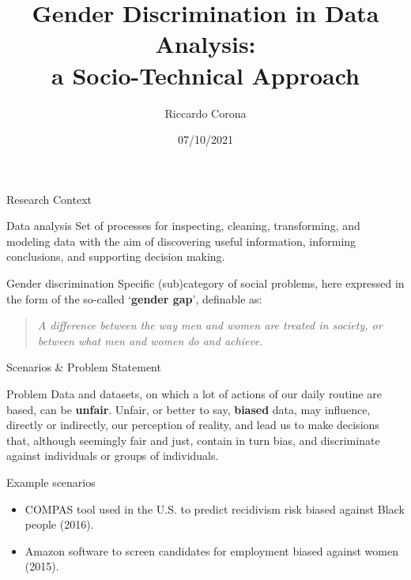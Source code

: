 \documentclass[usenames,dvipsnames]{beamer}
\title{Gender Discrimination in Data Analysis:\\a Socio-Technical Approach}
\author{Riccardo Corona}
\date{07/10/2021}
\begin{document}
    \begin{frame}
        \maketitle
    \end{frame}
    
    
    \begin{frame}{Research Context}
        \begin{block}{Data analysis}
            Set of processes for inspecting, cleaning, transforming, and modeling data with the aim of discovering useful information, informing conclusions, and supporting decision making.
        \end{block}
        \begin{block}{Gender discrimination}
            Specific (sub)category of social problems, here expressed in the form of the so-called `\textbf{gender gap}', definable as:
            \begin{quote}
            \emph{A difference between the way men and women are treated in society, or between what men and women do and achieve.}
            \end{quote}
        \end{block}
    \end{frame}
    
    
    \begin{frame}{Scenarios \& Problem Statement}
        \begin{block}{Problem}
            Data and datasets, on which a lot of actions of our daily routine are based, can be \textbf {unfair}. Unfair, or better to say, \textbf{biased} data, may influence, directly or indirectly, our perception of reality, and lead us to make decisions that, although seemingly fair and just, contain in turn bias, and discriminate against individuals or groups of individuals.
        \end{block}
        \begin{exampleblock}{Example scenarios}
            \begin{itemize}
                \item \textcolor{greenPolimi}{COMPAS} tool used in the U.S. to predict recidivism risk biased against Black people (2016).
                \item \textcolor{greenPolimi}{Amazon} software to screen candidates for employment biased against women (2015).
            \end{itemize}
        \end{exampleblock}
    \end{frame}
    
\end{document}

